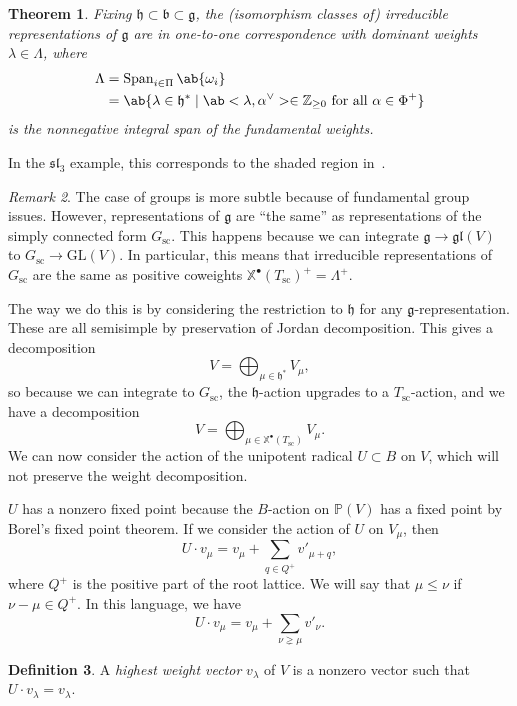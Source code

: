 \documentclass{amsart}
\newtheorem{thm}{Theorem}[section]
\theoremstyle{definition}
\newtheorem{defn}[thm]{Definition}
\theoremstyle{remark}
\newtheorem{rmk}[thm]{Remark}
\theoremstyle{plain}
\theoremstyle{definition}
\theoremstyle{remark}
\newcommand{\Z}{\mathbb{Z}}
\newcommand{\X}{\mathbb{X}}
\renewcommand{\P}{\mathbb{P}}
\newcommand{\g}{\mathfrak{g}}
\newcommand{\h}{\mathfrak{h}}
\renewcommand{\b}{\mathfrak{b}}
\newcommand{\mf}[1]{\mathfrak{#1}}
\newcommand{\mr}[1]{\mathrm{#1}}
\newcommand{\on}[1]{\operatorname{#1}}
\newcommand{\1}{\mathbf{1}}
\newcommand{\2}{\mathbf{2}}
\newcommand{\3}{\mathbf{3}}
\newcommand{\GL}{\mr{GL}}
\newcommand{\gl}{\mf{gl}}
\renewcommand{\sl}{\mf{sl}}
\begin{document}
\begin{thm}
    Fixing \(\h \subset \b \subset \g\), the (isomorphism classes of) irreducible representations of \(\g\) are in one-to-one correspondence with dominant weights \(\lambda \in \Lambda\), where
    \begin{align*}
        \Lambda &= \on{Span}_{i \in \Pi} \ab\{\omega_i \} \\
        &= \ab\{ \lambda \in \h^* \mid \ab<\lambda, \alpha^{\vee}> \in \Z_{\geq 0} \text{ for all } \alpha \in \Phi^+ \}
    \end{align*}
    is the nonnegative integral span of the fundamental weights.
\end{thm}

In the \(\sl_3\) example, this corresponds to the shaded region in~.

\begin{rmk}
    The case of groups is more subtle because of fundamental group issues. However, representations of \(\g\) are ``the same'' as representations of the simply connected form \(G_{\on{sc}}\). This happens because we can integrate \(\g \to \gl(V)\) to \(G_{\on{sc}} \to \GL(V)\). In particular, this means that irreducible representations of \(G_{\on{sc}}\) are the same as positive coweights \(\X^{\bullet}(T_{\on{sc}})^+ = \Lambda^+\).
        
    The way we do this is by considering the restriction to \(\h\) for any \(\g\)-representation. These are all semisimple by preservation of Jordan decomposition. This gives a decomposition
    \[ V = \bigoplus_{\mu \in \h^*} V_{\mu}, \]
    so because we can integrate to \(G_{\on{sc}}\), the \(\h\)-action upgrades to a \(T_{\on{sc}}\)-action, and we have a decomposition
    \[ V = \bigoplus_{\mu \in \X^{\bullet}(T_{\on{sc}})} V_{\mu}. \]
    We can now consider the action of the unipotent radical \(U \subset B\) on \(V\), which will not preserve the weight decomposition. 

    \(U\) has a nonzero fixed point because the \(B\)-action on \(\P(V)\) has a fixed point by Borel's fixed point theorem.
    If we consider the action of \(U\) on \(V_{\mu}\), then
    \[ U \cdot v_{\mu} = v_{\mu} + \sum_{q \in Q^+} v'_{\mu + q}, \]
    where \(Q^+\) is the positive part of the root lattice. We will say that \(\mu \leq \nu\) if \(\nu - \mu \in Q^+\). In this language, we have
    \[ U \cdot v_{\mu} = v_{\mu} + \sum_{\nu \gneq \mu} v'_{\nu}. \]
\end{rmk}

\begin{defn}
    A \textit{highest weight vector} \(v_{\lambda}\) of \(V\) is a nonzero vector such that \(U \cdot v_{\lambda} = v_{\lambda}\).
\end{defn}
\end{document}
